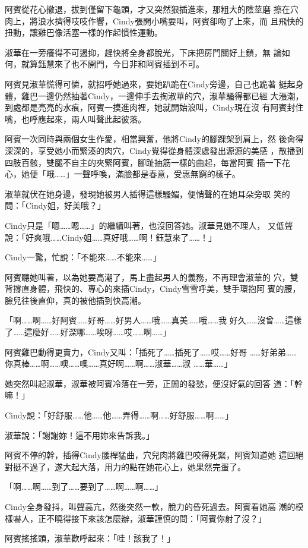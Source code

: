 阿賓從花心撤退，拔到僅留下龜頭，才又突然狠插進來，那粗大的陰莖磨
擦在穴肉上，將浪水擠得吱吱作響，Cindy張開小嘴要叫，阿賓卻吻了上來，而
且飛快的扭動，讓雞巴像活塞一樣的作起慣性運動。

淑華在一旁癢得不可遏抑，趕快將全身都脫光，下床把房門關好上鎖，無
論如何，就算鈺慧來了也不開門，今日非和阿賓插到不可。

阿賓見淑華慌得可憐，就招呼她過來，要她趴跪在Cindy旁邊，自己也跪著
挺起身體，雞巴一邊仍然抽著Cindy，一邊伸手去掏淑華的穴，淑華騷得都已經
大漲潮，到處都是亮亮的水痕，阿賓一摸進肉裡，她就開始浪叫，Cindy現在沒
有阿賓封住嘴，也呼應起來，兩人叫聲此起彼落。

阿賓一次同時與兩個女生作愛，相當興奮，他將Cindy的腳踝架到肩上，然
後肏得深深的，享受她小而緊湊的肉穴，Cindy覺得從身體深處發出源源的美感
，散播到四肢百骸，雙腿不自主的夾緊阿賓，腳趾抽筋一樣的曲起，每當阿賓
插一下花心，她便「哦……」一聲呼喚，滿臉都是春意，受惠無窮的樣子。

淑華就伏在她身邊，發現她被男人插得這樣騷媚，便悄聲的在她耳朵旁取
笑的問：「Cindy姐，好美哦？」

Cindy只是「嗯……嗯……」的繼續叫著，也沒回答她。淑華見她不理人，
又低聲說：「好爽哦……Cindy姐……真好哦……啊！鈺慧來了……！」

Cindy一驚，忙說：「不能來……不能來……」

阿賓聽她叫著，以為她要高潮了，馬上盡起男人的義務，不再理會淑華的
穴，雙背撐直身體，飛快的、專心的來插Cindy，Cindy雪雪呼美，雙手環抱阿
賓的腰，臉兒往後直仰，真的被他插到快高潮。

「啊……啊……好阿賓……好哥……好男人……哦……真美……哦……我
好久……沒曾……這樣了……這麼好……好深哪……唉呀……哎……啊……」

阿賓雞巴動得更賣力，Cindy又叫：「插死了……插死了……哎……好哥
……好弟弟……你真棒……啊……噢……噢……真好啊……啊……淑華……淑
……華……」

她突然叫起淑華，淑華被阿賓冷落在一旁，正閒的發愁，便沒好氣的回答
道：「幹嘛！」

Cindy說：「好舒服……他……他……弄得……啊……好舒服……啊……」

淑華說：「謝謝妳！這不用妳來告訴我。」

阿賓不停的幹，插得Cindy腰桿猛曲，穴兒肉將雞巴咬得死緊，阿賓知道她
這回絕對挺不過了，遂大起大落，用力的點在她花心上，她果然完蛋了。

「啊……啊……到了……要到了……啊……啊……」

Cindy全身發抖，叫聲高亢，然後突然一軟，脫力的昏死過去。阿賓看她高
潮的模樣嚇人，正不曉得接下來該怎麼辦，淑華謹慎的問：「阿賓你射了沒？」

阿賓搖搖頭，淑華歡呼起來：「哇！該我了！」

